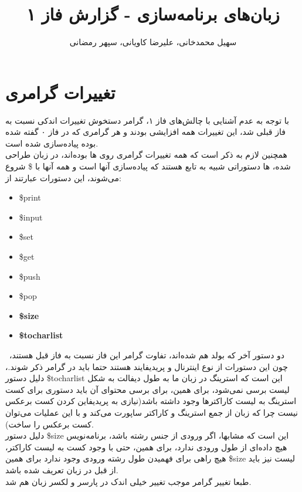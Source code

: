 \documentclass{article}
\title{زبان‌های برنامه‌سازی - گزارش فاز ۱}
\author{سهیل محمدخانی، علیرضا کاویانی، سپهر رمضانی
}
\date{} %
\begin{document}
\maketitle

\begingroup
\renewcommand{\baselinestretch}{0.8} %
\setlength{\parskip}{0pt} %
\small %
\tableofcontents
\endgroup
\newpage %

\section{تغییرات گرامری}
با توجه به عدم آشنایی با چالش‌های فاز ۱، گرامر دستخوش تغییرات اندکی نسبت به فاز قبلی شد، این تغییرات همه افزایشی بودند 
و هر گرامری که در فاز ۰ گفته شده بوده پیاده‌سازی شده است.\\
همچنین لازم به ذکر است که همه تغییرات گرامری روی 
ها بوده‌اند، در زبان طراحی شده، 
ها دستوراتی شبیه به تابع هستند که پیاده‌سازی آنها 
است و همه آنها با 
\$
شروع می‌شوند، این دستورات عبارتند از:
\begin{itemize}
        \item \$print
        \item \$input
        \item \$set 
        \item \$get 
        \item \$push
        \item \$pop
        \item \textbf{\$size} 
        \item \textbf{\$tocharlist}
\end{itemize}
\
دو دستور آخر که بولد هم شده‌اند، تفاوت گرامر این فاز نسبت به فاز قبل هستند، 
چون این دستورات از نوع اینترنال و پریدیفایند هستند حتما باید در گرامر ذکر شوند.، 
دلیل دستور 
\$tocharlist
این است که استرینگ در زبان ما به طول دیفالت به شکل لیست برسی نمی‌شود، برای همین، برای برسی محتوای آن باید دستوری 
برای کست استرینگ به لیست کاراکترها وجود داشته باشد(نیازی به پریدیفاین کردن کست برعکس نیست چرا که زبان از جمع استرینگ و کاراکتر ساپورت می‌کند و با این عملیات می‌توان کست برعکس را ساخت).
\\
دلیل دستور
\$size
این است که مشابها، اگر ورودی از جنس رشته باشد، برنامه‌نویس هیچ داده‌ای از طول ورودی ندارد،‌ برای همین، حتی با وجود کست به لیست کاراکتر، 
هیچ راهی برای فهمیدن طول رشته ورودی وجود ندارد برای همین \$size لیست نیز باید از قبل در زبان تعریف شده باشد.
\\
طبعا تغییر گرامر موجب تغییر خیلی اندک در پارسر و لکسر زبان هم شد.
\pagebreak
\end{document}
